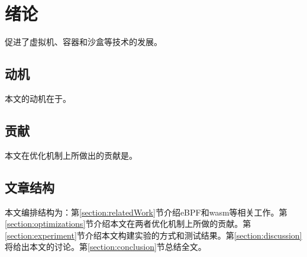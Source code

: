 \section{绪论}
促进了虚拟机、容器和沙盒等技术的发展。
\subsection{动机}
本文的动机在于。
\subsection{贡献}
本文在优化机制上所做出的贡献是。
\subsection{文章结构}
本文编排结构为：第\ref{section:relatedWork}节介绍eBPF和wasm等相关工作。第\ref{section:optimizations}节介绍本文在两者优化机制上所做的贡献。第\ref{section:experiment}节介绍本文构建实验的方式和测试结果。第\ref{section:discussion}将给出本文的讨论。第\ref{section:conclusion}节总结全文。
